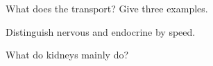 \begin{exercise}[$\star$]\label{exo:g9:physiology:3}
What does the  transport? Give three examples.
\end{exercise}

\begin{exercise}[$\star$]\label{exo:g9:physiology:4}
Distinguish nervous and endocrine  by speed.
\end{exercise}

\begin{exercise}[$\star$]\label{exo:g9:physiology:5}
What do kidneys mainly do?
\end{exercise}

